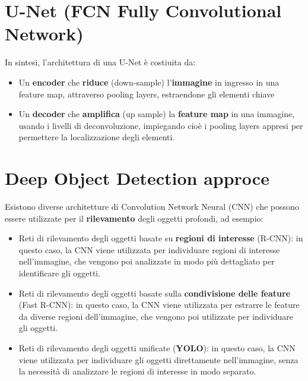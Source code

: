 \documentclass{article}
\begin{document}
\section{U-Net (FCN Fully Convolutional Network)}
In sintesi, l’architettura di una U-Net è costiuita da:
\begin{itemize}
    \item Un \textbf{encoder} che \textbf{riduce} (down-sample) l’\textbf{immagine} in ingresso in una feature map, attraverso pooling layers, estraendone gli elementi chiave
    \item Un \textbf{decoder} che \textbf{amplifica} (up sample) la \textbf{feature map} in una immagine, usando i livelli di deconvoluzione, impiegando cioè i pooling layers appresi per permettere la localizzazione degli elementi.
\end{itemize}

\section{Deep Object Detection approce}
Esistono diverse architetture di Convolution Network Neural (CNN) che possono essere utilizzate per il \textbf{rilevamento} degli oggetti profondi, ad esempio:
\begin{itemize}
    \item Reti di rilevamento degli oggetti basate su \textbf{regioni di interesse} (R-CNN): in questo caso, la CNN viene utilizzata per individuare regioni di interesse nell'immagine, che vengono poi analizzate in modo più dettagliato per identificare gli oggetti.
    \item Reti di rilevamento degli oggetti basate sulla \textbf{condivisione delle feature} (Fast R-CNN): in questo caso, la CNN viene utilizzata per estrarre le feature da diverse regioni dell'immagine, che vengono poi utilizzate per individuare gli oggetti.
    \item Reti di rilevamento degli oggetti unificate (\textbf{YOLO}): in questo caso, la CNN viene utilizzata per individuare gli oggetti direttamente nell'immagine, senza la necessità di analizzare le regioni di interesse in modo separato.
\end{itemize}
\end{document}
